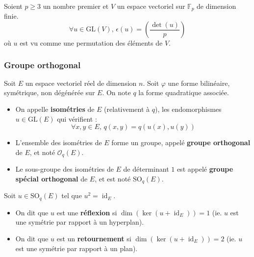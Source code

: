
  \begin{application}
    Soient $p \geq 3$ un nombre premier et $V$ un espace vectoriel sur $\mathbb{F}_p$ de dimension finie.
    \[ \forall u \in \mathrm{GL}(V), \, \epsilon(u) = \left( \frac{\det(u)}{p} \right) \]
    où $u$ est vu comme une permutation des éléments de $V$.
  \end{application}

  \subsubsection{Groupe orthogonal}


  Soit $E$ un espace vectoriel réel de dimension $n$. Soit $\varphi$ une forme bilinéaire, symétrique, non dégénérée sur $E$. On note $q$ la forme quadratique associée.

  \begin{definition}
    \begin{itemize}
      \item On appelle \textbf{isométries} de $E$ (relativement à $q$), les endomorphismes $u \in \mathrm{GL}(E)$ qui vérifient :
      \[ \forall x, y \in E, \, q(x,y) = q(u(x), u(y)) \]
      \item L'ensemble des isométries de $E$ forme un groupe, appelé \textbf{groupe orthogonal} de $E$, et noté $\mathcal{O}_q(E)$.
      \item Le sous-groupe des isométries de $E$ de déterminant $1$ est appelé \textbf{groupe spécial orthogonal} de $E$, et est noté $\mathrm{SO}_q(E)$.
    \end{itemize}

  \end{definition}

  \begin{definition}
    Soit $u \in \mathrm{SO}_q(E)$ tel que $u^2 = \operatorname{id}_E$.
    \begin{itemize}
      \item On dit que $u$ est une \textbf{réflexion} si $\dim(\ker(u+\operatorname{id}_E)) = 1$ (ie. $u$ est une symétrie par rapport à un hyperplan).
      \item On dit que $u$ est un \textbf{retournement} si $\dim(\ker(u+\operatorname{id}_E)) = 2$ (ie. $u$ est une symétrie par rapport à un plan).
    \end{itemize}
  \end{definition}

